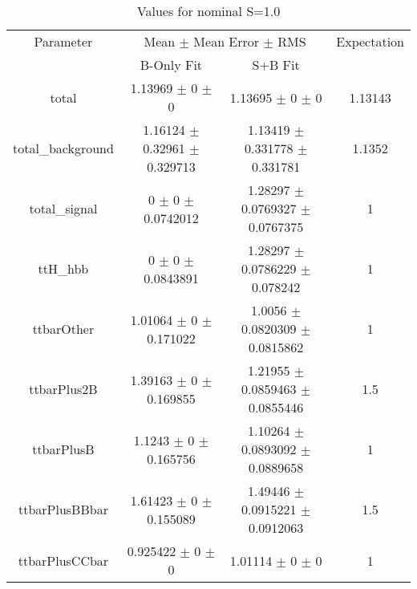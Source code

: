\begin{table}
\centering
\caption{Values for nominal S=1.0}
\begin{tabular}{cccc}
\toprule
Parameter & \multicolumn{2}{c}{Mean $\pm$ Mean Error $\pm$ RMS} & Expectation\\
 & B-Only Fit & S+B Fit & \\
\midrule
total & \num{1.13969} $\pm$ \num{0} $\pm$ \num{0} & \num{1.13695} $\pm$ \num{0} $\pm$ \num{0} & \num{1.13143}\\
total\_background & \num{1.16124} $\pm$ \num{0.32961} $\pm$ \num{0.329713} & \num{1.13419} $\pm$ \num{0.331778} $\pm$ \num{0.331781} & \num{1.1352}\\
total\_signal & \num{0} $\pm$ \num{0} $\pm$ \num{0.0742012} & \num{1.28297} $\pm$ \num{0.0769327} $\pm$ \num{0.0767375} & \num{1}\\
ttH\_hbb & \num{0} $\pm$ \num{0} $\pm$ \num{0.0843891} & \num{1.28297} $\pm$ \num{0.0786229} $\pm$ \num{0.078242} & \num{1}\\
ttbarOther & \num{1.01064} $\pm$ \num{0} $\pm$ \num{0.171022} & \num{1.0056} $\pm$ \num{0.0820309} $\pm$ \num{0.0815862} & \num{1}\\
ttbarPlus2B & \num{1.39163} $\pm$ \num{0} $\pm$ \num{0.169855} & \num{1.21955} $\pm$ \num{0.0859463} $\pm$ \num{0.0855446} & \num{1.5}\\
ttbarPlusB & \num{1.1243} $\pm$ \num{0} $\pm$ \num{0.165756} & \num{1.10264} $\pm$ \num{0.0893092} $\pm$ \num{0.0889658} & \num{1}\\
ttbarPlusBBbar & \num{1.61423} $\pm$ \num{0} $\pm$ \num{0.155089} & \num{1.49446} $\pm$ \num{0.0915221} $\pm$ \num{0.0912063} & \num{1.5}\\
ttbarPlusCCbar & \num{0.925422} $\pm$ \num{0} $\pm$ \num{0} & \num{1.01114} $\pm$ \num{0} $\pm$ \num{0} & \num{1}\\
\bottomrule
\end{tabular}
\end{table}